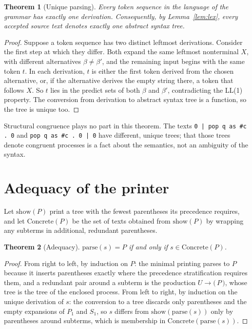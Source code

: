 \documentclass[11pt,openany]{book}
\newtheorem{theorem}{Theorem}[chapter]
\theoremstyle{remark}
\begin{document}
\begin{theorem}[Unique parsing]\label{thm:parse}
Every token sequence in the language of the grammar has exactly one
derivation. Consequently, by Lemma~\ref{lem:lex}, every accepted source
text denotes exactly one abstract syntax tree.
\end{theorem}

\begin{proof}
Suppose a token sequence has two distinct leftmost derivations. Consider
the first step at which they differ. Both expand the same leftmost
nonterminal $X$, with different alternatives $\beta\ne\beta'$, and the
remaining input begins with the same token $t$. In each derivation, $t$
is either the first token derived from the chosen alternative, or, if the
alternative derives the empty string there, a token that follows $X$. So
$t$ lies in the predict sets of both $\beta$ and $\beta'$, contradicting
the LL(1) property. The conversion from derivation to abstract syntax
tree is a function, so the tree is unique too.
\end{proof}

Structural congruence plays no part in this theorem. The texts
\texttt{0 | pop q as \#c . 0} and \texttt{pop q as \#c . 0 | 0} have
different, unique trees; that those trees denote congruent processes is a
fact about the semantics, not an ambiguity of the syntax.

\section{Adequacy of the printer}

Let $\mathrm{show}(P)$ print a tree with the fewest parentheses its
precedence requires, and let $\mathrm{Concrete}(P)$ be the set of texts
obtained from $\mathrm{show}(P)$ by wrapping any subterms in additional,
redundant parentheses.

\begin{theorem}[Adequacy]\label{thm:adequacy}
$\mathrm{parse}(s)=P$ if and only if $s\in\mathrm{Concrete}(P)$.
\end{theorem}

\begin{proof}
From right to left, by induction on $P$: the minimal printing parses to
$P$ because it inserts parentheses exactly where the precedence
stratification requires them, and a redundant pair around a subterm is
the production $U\to\texttt{(}\,P\,\texttt{)}$, whose tree is the tree of
the enclosed process. From left to right, by induction on the unique
derivation of $s$: the conversion to a tree discards only parentheses and
the empty expansions of $P_1$ and $S_1$, so $s$ differs from
$\mathrm{show}(\mathrm{parse}(s))$ only by parentheses around subterms,
which is membership in $\mathrm{Concrete}(\mathrm{parse}(s))$.
\end{proof}
\end{document}
